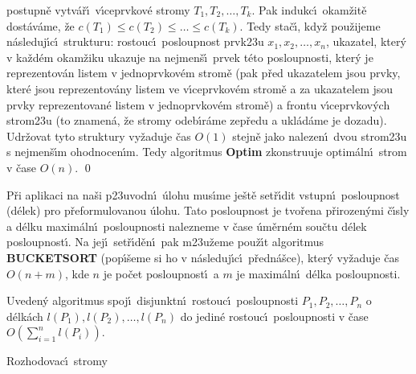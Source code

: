 po\-stupn\v e vytv\'a\v r\'\i\ v\'\i ceprvkov\'e stromy $T_1,T_2,\dots,T_k$. Pak indukc\'\i\ okam\v zit\v e 
dost\'av\'ame, \v ze $c\left(T_1\right)\le c\left(T_2\right)\le\dots\le c\left(T_k\right)$.  Tedy sta\v c\'\i, kdy\v z 
pou\v zijeme n\'asleduj\'\i c\'\i\ strukturu:  rostouc\'\i\ posloupnost 
prvk\accent23u $x_1,x_2,\dots,x_n$, ukazatel, 
kter\'y v ka\v zd\'em okam\v ziku ukazuje na nejmen\v s\'\i\ prvek 
t\'eto posloupnosti, 
kter\'y je reprezentov\'an listem v jednoprvkov\'em 
strom\v e (pak p\v red ukazatelem jsou prvky, kter\'e jsou 
reprezentov\'any listem ve v\'\i\-ce\-prvkov\'em strom\v e a za 
ukazatelem jsou prvky reprezentovan\'e listem v jednoprvkov\'em 
stro\-m\v e) a frontu v\'\i\-ce\-prvkov\'ych strom\accent23u (to 
znamen\'a, \v ze stromy odeb\'\i r\'ame zep\v redu a ukl\'ad\'ame je dozadu).  
Udr\v zovat tyto struktury vy\v za\-duje \v cas $O\left(1\right)$ stejn\v e jako 
nalezen\'\i\ dvou strom\accent23u s nej\-men\v s\'\i m ohodnocen\'\i m.  
Tedy algoritmus {\bf Optim} zkonstruuje optim\'aln\'\i\ strom v \v case $
O\left(n\right)$. \qed
\enddemo

\flushpar P\v ri aplikaci na na\v si p\accent23uvodn\'\i\ \'ulohu mus\'\i me 
je\v st\v e set\v r\'\i dit vstupn\'\i\ posloupnost (d\'elek) pro p\v reformu\-lo\-vanou \'ulohu.
Tato posloupnost je tvo\v rena p\v rirozen\'ymi \v c\'\i sly a d\'elku 
maxim\'aln\'\i\ posloupnosti nalezneme v \v case \'um\v ern\'em sou\v ctu 
d\'elek posloupnost\'\i . Na jej\'\i\ set\v r\'\i d\v en\'\i\ pak 
m\accent23u\v zeme pou\v z\'\i t algoritmus {\bf BUCKETSORT} (pop\'\i \v seme si ho v 
n\'asleduj\'\i c\'\i\ p\v redn\'a\v sce), kter\'y 
vy\v zaduje \v cas $O\left(n+m\right)$, kde $n$ je po\v cet posloupnost\'\i\ a $
m$ je 
maxim\'aln\'\i\ d\'elka posloupnosti.
\medskip

Uveden\'y algoritmus spoj\'\i\ 
disjunktn\'\i\ rostou\-c\'\i\ 
po\-sloup\-nosti $P_1,P_2,\dots,P_n$ o d\'elk\'ach $l\left(P_1\right),l\left(P_2\right)
,\dots,l\left(P_n\right)$ 
do jedin\'e rostouc\'\i\ posloupnosti v \v case 
$O\left(\sum_{i=1}^nl\left(P_i\right)\right)$.
\endproclaim

\heading
Rozhodovac\'\i\ stromy
\endheading


